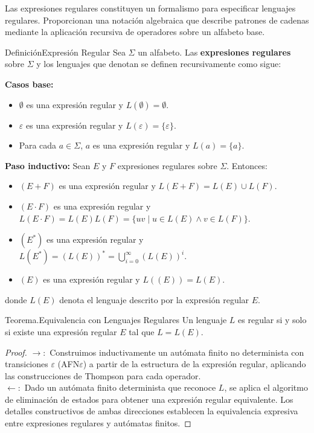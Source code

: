 \documentclass[10pt]{book}
\begin{document}
Las expresiones regulares constituyen un formalismo para especificar lenguajes regulares. Proporcionan una notación algebraica que describe patrones de cadenas mediante la aplicación recursiva de operadores sobre un alfabeto base.

\begin{definition}[]{Definición}{Expresión Regular}
Sea $\Sigma$ un alfabeto. Las \textbf{expresiones regulares} sobre $\Sigma$ y los lenguajes que denotan se definen recursivamente como sigue:

\textbf{Casos base:}
\begin{itemize}
    \item $\emptyset$ es una expresión regular y $L(\emptyset) = \emptyset$.
    \item $\varepsilon$ es una expresión regular y $L(\varepsilon) = \{\varepsilon\}$.
    \item Para cada $a \in \Sigma$, $a$ es una expresión regular y $L(a) = \{a\}$.
\end{itemize}

\textbf{Paso inductivo:} Sean $E$ y $F$ expresiones regulares sobre $\Sigma$. Entonces:
\begin{itemize}
    \item $(E + F)$ es una expresión regular y $L(E + F) = L(E) \cup L(F)$.
    \item $(E \cdot F)$ es una expresión regular y $L(E \cdot F) = L(E)L(F) = \{uv \mid u \in L(E) \land v \in L(F)\}$.
    \item $(E^*)$ es una expresión regular y $L(E^*) = (L(E))^* = \bigcup_{i=0}^{\infty} (L(E))^i$.
    \item $(E)$ es una expresión regular y $L((E)) = L(E)$.
\end{itemize}

donde $L(E)$ denota el lenguaje descrito por la expresión regular $E$.
\end{definition}

\begin{theorem}[]{Teorema.}{Equivalencia con Lenguajes Regulares}
Un lenguaje $L$ es regular si y solo si existe una expresión regular $E$ tal que $L = L(E)$.
\end{theorem}

\begin{proof}
  \(\to :\) Construimos inductivamente un autómata finito no determinista con transiciones $\varepsilon$ (AFN$\varepsilon$) a partir de la estructura de la expresión regular, aplicando las construcciones de Thompson para cada operador. \\
  \(\leftarrow : \) Dado un autómata finito determinista que reconoce $L$, se aplica el algoritmo de eliminación de estados para obtener una expresión regular equivalente. Los detalles constructivos de ambas direcciones establecen la equivalencia expresiva entre expresiones regulares y autómatas finitos.
\end{proof}
\end{document}
